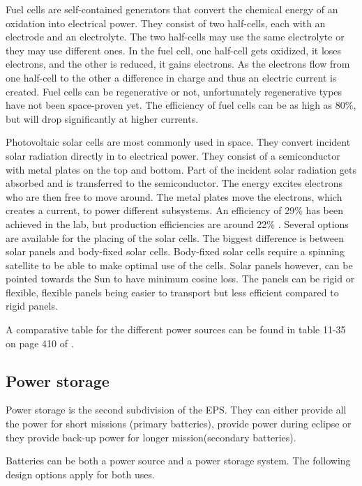 Fuel cells are self-contained generators that convert the chemical energy of an oxidation into electrical power. They consist of two half-cells, each with an electrode and an electrolyte. The two half-cells may use the same electrolyte or they may use different ones. In the fuel cell, one half-cell gets oxidized, it loses electrons, and the other is reduced, it gains electrons. As the electrons flow from one half-cell to the other a difference in charge and thus an electric current is created. Fuel cells can be regenerative or not, unfortunately regenerative types have not been space-proven yet\cite{rees}. The efficiency of fuel cells can be as high as 80\%, but will drop significantly at higher currents.

Photovoltaic solar cells are most commonly used in space. They convert incident solar radiation directly in to electrical power. They consist of a semiconductor with metal plates on the top and bottom. Part of the incident solar radiation gets absorbed and is transferred to the semiconductor. The energy excites electrons who are then free to move around. The metal plates move the electrons, which creates a current, to power different subsystems. An efficiency of 29\% has been achieved \cite{doody1} in the lab, but production efficiencies are around 22\% \cite{larson}. Several options are available for the placing of the solar cells. The biggest difference is between solar panels and body-fixed solar cells. Body-fixed solar cells require a spinning satellite to be able to make optimal use of the cells. Solar panels however, can be pointed towards the Sun to have minimum cosine loss. The panels can be rigid or flexible, flexible panels being easier to transport but less efficient compared to rigid panels.

A comparative table for the different power sources can be found in table 11-35 on page 410 of \cite{larson}.

\subsection{Power storage}
\label{blDOstorage}

Power storage is the second subdivision of the \ac{EPS}. They can either provide all the power for short missions (primary batteries), provide power during eclipse or they provide back-up power for longer mission(secondary batteries).

Batteries can be both a power source and a power storage system. The following design options apply for both uses.


